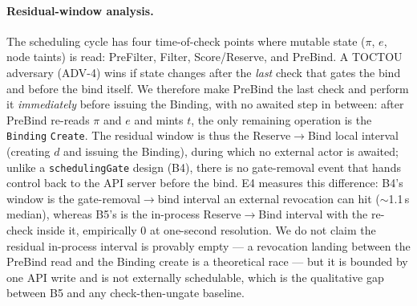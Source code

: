 \paragraph{Residual-window analysis.}
The scheduling cycle has four time-of-check points where mutable state ($\pi$,
$e$, node taints) is read: PreFilter, Filter, Score/Reserve, and PreBind. A
TOCTOU adversary (ADV-4) wins if state changes after the \emph{last} check that
gates the bind and before the bind itself. We therefore make PreBind the last
check and perform it \emph{immediately} before issuing the Binding, with no
awaited step in between: after PreBind re-reads $\pi$ and $e$ and mints $t$, the
only remaining operation is the \texttt{Binding} \texttt{Create}. The residual
window is thus the Reserve$\to$Bind local interval (creating $d$ and issuing the
Binding), during which no external actor is awaited; unlike a
\texttt{schedulingGate} design (B4), there is no gate-removal event that hands
control back to the API server before the bind. E4 measures this difference: B4's
window is the gate-removal$\to$bind interval an external revocation can hit
($\sim$1.1\,s median), whereas B5's is the in-process Reserve$\to$Bind interval
with the re-check inside it, empirically $0$ at one-second resolution. We do not
claim the residual in-process interval is provably empty --- a revocation landing
between the PreBind read and the Binding create is a theoretical race --- but it
is bounded by one API write and is not externally schedulable, which is the
qualitative gap between B5 and any check-then-ungate baseline.
